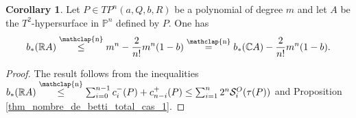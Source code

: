 \documentclass[12pt]{article}
\newcommand\customeq{\stackrel{\mathclap{\normalfont\scriptsize\mbox{n}}}{=}}
\newcommand\customleq{\stackrel{\mathclap{\normalfont\scriptsize\mbox{n}}}{\leq}}
\newcommand{\C}{\mathbb{C}}
\renewcommand{\P}{\mathbb{P}}
\theoremstyle{definition}
\newtheorem{thm}{Theorem}[section]
\newtheorem{cor}{Corollary}[section]
\begin{document}
\begin{cor}
    Let $P \in TP^n(a, Q, b, R)$ be a polynomial of degree $m$ and let $A$ be the $T^2$-hypersurface in $\P^n$ defined by $P$. One has
    \begin{equation*}b_*(\mathbb{R}A) \customleq m^n - \frac{2}{n!}m^n(1-b) \customeq b_*(\C A) - \frac{2}{n!}m^n(1-b).\end{equation*}
\end{cor}

\begin{proof}
    The result follows from the inequalities $b_*(\mathbb{R}A) \customleq \sum_{i=0}^{n-1}c_i^-(P) +c_{n-i}^+(P) \leq \sum_{i=1}^n 2^n \mathcal{S}_i^O(\tau(P))$ and Proposition \ref{thm_nombre_de_betti_total_cas_1}.
\end{proof}



    

\end{document}
